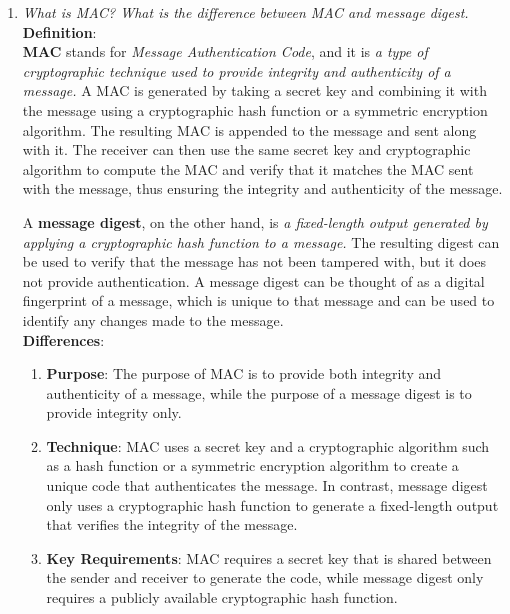 \documentclass[11pt]{article}
\begin{document}
\begin{enumerate}
    \item \textit{What is MAC? What is the difference between MAC and message digest.} \\

          \textbf{\textbf{Definition}}: \\

          \textbf{MAC} stands for \textit{Message Authentication Code}, and it is \textit{a type of cryptographic technique used to provide integrity and authenticity of a message.} A MAC is generated by taking a secret key and combining it with the message using a cryptographic hash function or a symmetric encryption algorithm. The resulting MAC is appended to the message and sent along with it. The receiver can then use the same secret key and cryptographic algorithm to compute the MAC and verify that it matches the MAC sent with the message, thus ensuring the integrity and authenticity of the message.

          A \textbf{message digest}, on the other hand, is \textit{a fixed-length output generated by applying a cryptographic hash function to a message.} The resulting digest can be used to verify that the message has not been tampered with, but it does not provide authentication. A message digest can be thought of as a digital fingerprint of a message, which is unique to that message and can be used to identify any changes made to the message.\\


          \textbf{Differences}:\\

          \begin{enumerate}
              \item \textbf{Purpose}: The purpose of MAC is to provide both integrity and authenticity of a message, while the purpose of a message digest is to provide integrity only.

              \item \textbf{Technique}: MAC uses a secret key and a cryptographic algorithm such as a hash function or a symmetric encryption algorithm to create a unique code that authenticates the message. In contrast, message digest only uses a cryptographic hash function to generate a fixed-length output that verifies the integrity of the message.

              \item \textbf{Key Requirements}: MAC requires a secret key that is shared between the sender and receiver to generate the code, while message digest only requires a publicly available cryptographic hash function.


\end{enumerate}
\end{enumerate}
\end{document}
